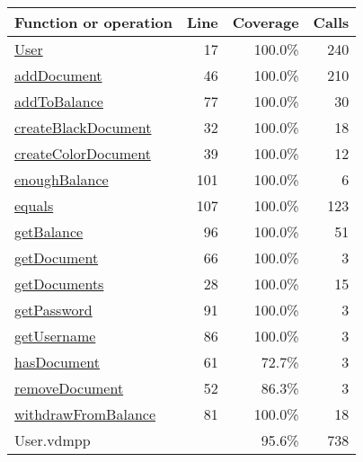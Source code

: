 \begin{longtable}{|l|r|r|r|}
\hline
Function or operation & Line & Coverage & Calls \\
\hline
\hline
\hyperref[User:17]{User} & 17&100.0\% & 240 \\
\hline
\hyperref[addDocument:46]{addDocument} & 46&100.0\% & 210 \\
\hline
\hyperref[addToBalance:77]{addToBalance} & 77&100.0\% & 30 \\
\hline
\hyperref[createBlackDocument:32]{createBlackDocument} & 32&100.0\% & 18 \\
\hline
\hyperref[createColorDocument:39]{createColorDocument} & 39&100.0\% & 12 \\
\hline
\hyperref[enoughBalance:101]{enoughBalance} & 101&100.0\% & 6 \\
\hline
\hyperref[equals:107]{equals} & 107&100.0\% & 123 \\
\hline
\hyperref[getBalance:96]{getBalance} & 96&100.0\% & 51 \\
\hline
\hyperref[getDocument:66]{getDocument} & 66&100.0\% & 3 \\
\hline
\hyperref[getDocuments:28]{getDocuments} & 28&100.0\% & 15 \\
\hline
\hyperref[getPassword:91]{getPassword} & 91&100.0\% & 3 \\
\hline
\hyperref[getUsername:86]{getUsername} & 86&100.0\% & 3 \\
\hline
\hyperref[hasDocument:61]{hasDocument} & 61&72.7\% & 3 \\
\hline
\hyperref[removeDocument:52]{removeDocument} & 52&86.3\% & 3 \\
\hline
\hyperref[withdrawFromBalance:81]{withdrawFromBalance} & 81&100.0\% & 18 \\
\hline
\hline
User.vdmpp & & 95.6\% & 738 \\
\hline
\end{longtable}

